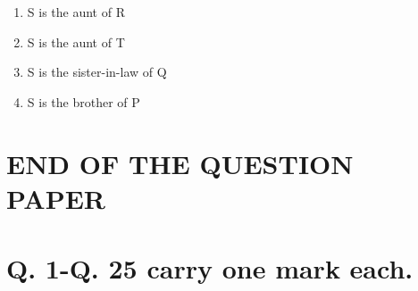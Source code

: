 \documentclass[journal,12pt,onecolumn]{IEEEtran}
\theoremstyle{remark}
\begin{document}
\begin{enumerate}
\hfill{}
\begin{enumerate}
\item S is the aunt of R
\item  S is the aunt of T
\item S is the sister-in-law of Q
\item  S is the brother of P
\end{enumerate}

\section*{END OF THE QUESTION PAPER}
\end{enumerate}

\section*{Q. 1-Q. 25 carry one mark each.}
\end{document}

